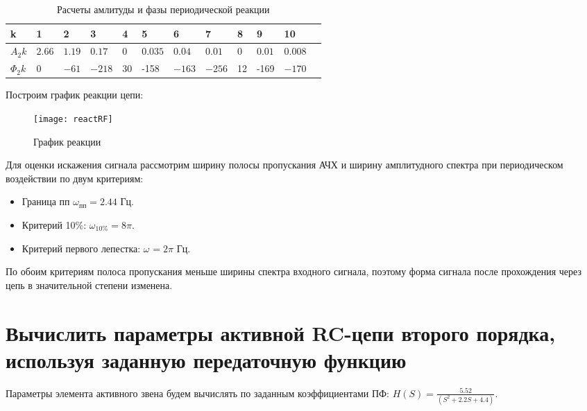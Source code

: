 \documentclass[a4paper,14pt ]{article} %
\begin{document}
    \begin{table*}[h!]
        \centering
        \begin{tabularx}{\linewidth} { | X | X | X | X | X | X | X | X | X | X | X | X |}
            \hline
            k & 1 & 2 & 3 & 4 & 5 & 6 & 7 & 8 & 9 & 10\\
            \hline
            $A_2k$ & $2.66$ & $1.19$ & $0.17$ &0  & $0.035$ & $0.04$& 
            $0.01$ & 0 & $0.01$ & $0.008$ \\
            \hline
            $\Phi_2k$ & 0 & $ -61 $ & $-218$ & 30 & -158 & $-163$ & $-256$ & 12 & -169 & $-170$\\
            \hline
        \end{tabularx}
        \caption{Расчеты амлитуды и фазы периодической реакции}
        \label{table:3}

    \end{table*}
    Построим график реакции цепи:
    \begin{figure}[H]
        \centering
        \texttt{[image: reactRF]}
        \caption{График реакции}
        \label{fig:10}
    \end{figure}
   Для оценки искажения сигнала рассмотрим ширину полосы пропускания АЧХ и 
   ширину амплитудного спектра при периодическом воздействии по двум критериям:
   \begin{itemize}
    \item Граница пп $\omega_\text{пп} = 2.44$ Гц.
    \item Критерий 10\%: $\omega_\text{10\%} = 8\pi$.
    \item Критерий первого лепестка: $\omega_\text{} = 2\pi$ Гц.
   \end{itemize}

   По обоим критериям полоса пропускания меньше ширины спектра входного сигнала, поэтому 
   форма сигнала после прохождения через цепь в значительной степени изменена. 
\section{Вычислить параметры активной RC-цепи второго порядка, используя заданную передаточную функцию}
   Параметры элемента активного звена будем вычислять по заданным коэффициентами ПФ:
   $ H(S) = \frac{5.52}{(S^2 + 2.2S+ 4.4)} $.
   \\
   \\
   \\
   \\
   \\
   \\
   \\
\end{document}

